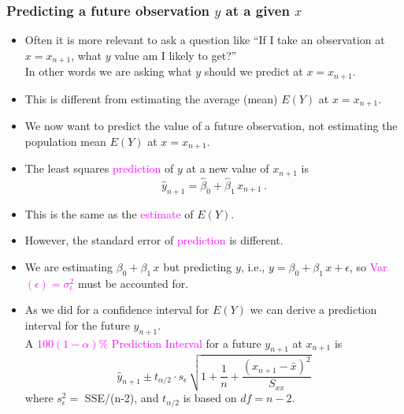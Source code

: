 \documentclass[xcolor=dvipsnames,12pt]{beamer}
\begin{document}
\begin{frame}
\frametitle{Predicting a future observation
{$y$} at a given {$x$}}
\begin{itemize}
\item Often it is more relevant to ask a question like ``If I take an
observation at $x = x_{n+1}$, what $y$ value am I likely to get?''\\[.1in]
 In other words we are asking what $y$ should we predict at 
$x = x_{n+1}$. \\[.1in]
\item This is different from estimating the
average (mean) $E(Y)$ at  $x = x_{n+1}$.  \\[.1in]
\item We now want to
predict the value of a future observation, not estimating the population
mean $ E(Y)$ at  $x = x_{n+1}$.\\[.1in]
\item The least squares \textcolor{magenta}{prediction} of $y$ 
at a new value of $x_{n+1}$ is
$$
  \hat{y}_{n+1} = \hat{\beta}_0 + \hat{\beta}_1\, x_{n+1}\, .
$$
\end{itemize}
\end{frame}


\begin{frame}
\begin{itemize}
\item This is the same as the \textcolor{magenta}{estimate} of $E(Y)$.\\[.1in] 
\item However, the standard error of \textcolor{magenta}{prediction} is
different.\\[.1in]
\item We are estimating $\beta_0 + \beta_1\,x$ but predicting $y$, i.e.,
$y=\beta_0 + \beta_1\,x + \epsilon$, so \textcolor{magenta}{Var$(\epsilon)=\sigma^2_{\epsilon}$} must be accounted for. \\[.1in]
\item As we did for a confidence interval for $E(Y)$ we can derive a
 prediction interval for the future $y_{n+1}$.\\[.1in] 
A \textcolor{magenta}{$100(1-\alpha)$\% Prediction Interval} for a future $y_{n+1}$ at 
$x_{n+1}$ is
$$
\hat{y}_{n+1} \pm t_{\alpha/2} \cdot s_\epsilon \,
  \sqrt{1 + \frac1n + \frac{(x_{n+1}-\bar{x})^2}{S_{xx}}}
$$
where $s_\epsilon^2 = $ SSE/(n-2), and $t_{\alpha/2}$ is based on $df
= n-2$.
\end{itemize}
\end{frame}
\end{document}

